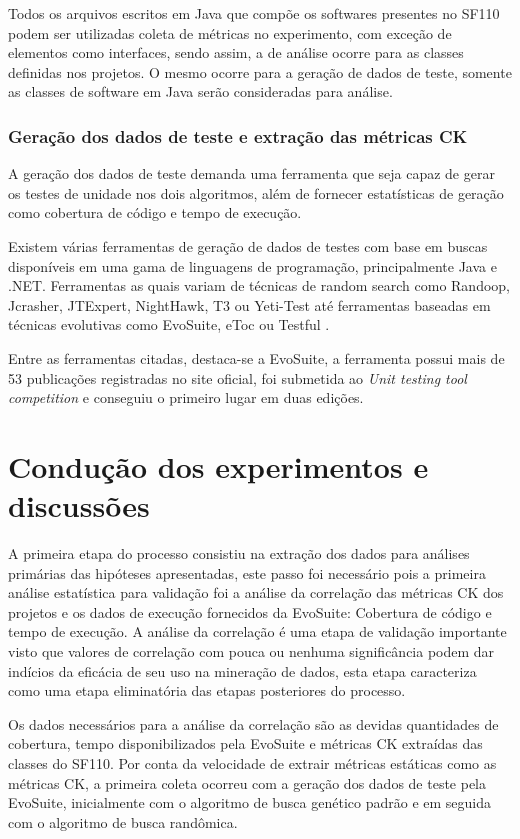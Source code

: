 \documentclass[
	12pt,				%
	oneside,			%
	a4paper,			%
	english,			%
	brazil				%
	]{abntex2ppgsi}
\begin{document}
Todos os arquivos escritos em Java que compõe os softwares presentes no SF110 podem ser utilizadas coleta de métricas no experimento, com exceção de elementos como interfaces, sendo assim, a de análise ocorre para as classes definidas nos projetos. O mesmo ocorre para a geração de dados de teste, somente as classes de software em Java serão consideradas para análise.

\subsection{Geração dos dados de teste e extração das métricas CK}

A geração dos dados de teste demanda uma ferramenta que seja capaz de gerar os testes de unidade nos dois algoritmos, além de fornecer estatísticas de geração como cobertura de código e tempo de execução.

Existem várias ferramentas de geração de dados de testes com base em buscas disponíveis em uma gama de linguagens de programação, principalmente Java e .NET. Ferramentas as quais variam de técnicas de random search como Randoop, Jcrasher, JTExpert, NightHawk, T3 ou Yeti-Test até ferramentas baseadas em técnicas evolutivas como EvoSuite, eToc ou Testful \cite{shamriski20151115}. 

Entre as ferramentas citadas, destaca-se a EvoSuite, a ferramenta possui mais de 53 publicações registradas no site oficial, foi submetida ao \textit{Unit testing tool competition} e conseguiu o primeiro lugar em duas edições.



 \chapter{Condução dos experimentos e discussões}
  A primeira etapa do processo consistiu na  extração dos dados para análises primárias das hipóteses apresentadas, este passo foi necessário pois a primeira análise estatística  para validação foi a análise da correlação das métricas CK dos projetos e os dados de execução fornecidos da EvoSuite: Cobertura de código e tempo de execução. A análise da correlação é uma etapa de validação importante visto que valores de correlação com pouca ou nenhuma significância podem dar indícios da eficácia de seu uso na mineração de dados, esta etapa caracteriza como uma etapa eliminatória das etapas posteriores do processo. 
  
 Os dados necessários para a análise da correlação são as devidas quantidades de cobertura, tempo disponibilizados pela EvoSuite e métricas CK extraídas das classes do SF110. Por conta da velocidade de extrair métricas estáticas como as métricas CK, a primeira coleta ocorreu com a geração dos dados de teste pela EvoSuite, inicialmente com o algoritmo de busca genético padrão e em seguida com o algoritmo de busca randômica.
 
\end{document}
